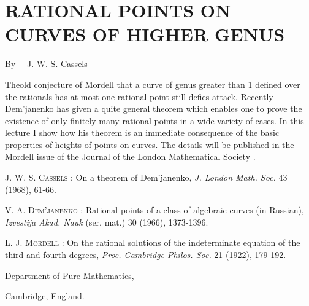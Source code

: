 \chapter[\textsc{J. W. S. Cassels~:} Rational Points on Curves of Higher Genus]{RATIONAL POINTS ON CURVES OF HIGHER GENUS}\label{art06}

\begin{center}
By~~ J. W. S. Cassels
\end{center}


\setcounter{pageoriginal}{82}
The\pageoriginale old conjecture of Mordell \cite{art06-key3} that a curve of genus greater than 1 defined over the rationals has at most one rational point still defies attack. Recently Dem'janenko \cite{art06-key2} has given a quite general theorem which enables one to prove the existence of only finitely many rational points in a wide variety of cases. In this lecture I show how his theorem is an immediate consequence of the basic properties of heights of points on curves. The details will be published in the Mordell issue of the Journal of the London Mathematical Society \cite{art06-key1}.

\begin{thebibliography}{99}
 \textsc{J. W. S. Cassels :} On a theorem of Dem'janenko, {\em J. London Math. Soc.} 43 (1968), 61-66.

 \textsc{V. A. Dem'janenko :} Rational points of a class of algebraic curves (in Russian), {\em Izvestija Akad. Nauk} (ser. mat.) 30 (1966), 1373-1396.

 \textsc{L. J. Mordell :} On the rational solutions of the indeterminate equation of the third and fourth degrees, {\em Proc. Cambridge Philos. Soc.} 21 (1922), 179-192.
\end{thebibliography}

\medskip
\noindent
{\small Department of Pure Mathematics,}

\noindent
{\small Cambridge, England.}
